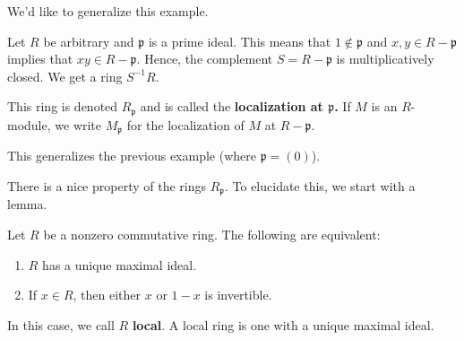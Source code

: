 We'd like to generalize this example.

\begin{example}
Let $R$ be arbitrary and $\mathfrak{p}$ is a prime ideal.  This means that $1
\notin \mathfrak{p}$ and $x,y \in R - \mathfrak{p}$ implies that $xy \in R -
\mathfrak{p}$. Hence, the complement $S = R- \mathfrak{p}$  is multiplicatively
closed.  We get a ring $S^{-1}R$.

\begin{definition}
This ring is denoted $R_{\mathfrak{p}}$ and is called the \textbf{localization
at $\mathfrak{p}$.} If $M$ is an $R$-module, we write $M_{\mathfrak{p}}$ for
the localization of $M$ at $R - \mathfrak{p}$.
\end{definition}
This generalizes the previous example (where $\mathfrak{p} = (0)$).
\end{example}

There is a nice property of the rings $R_{\mathfrak{p}}$. To elucidate this,
we start with a lemma.

\begin{lemma}
Let $R$ be a nonzero commutative ring. The following are equivalent:
\begin{enumerate}
\item  $R$ has a unique maximal ideal.
\item If $x \in R$, then either $x$ or $1-x$ is invertible.
\end{enumerate}
\end{lemma}

\begin{definition}
In this case, we call $R$ \textbf{local}.  A local ring is one with a unique
maximal ideal.
\end{definition}


